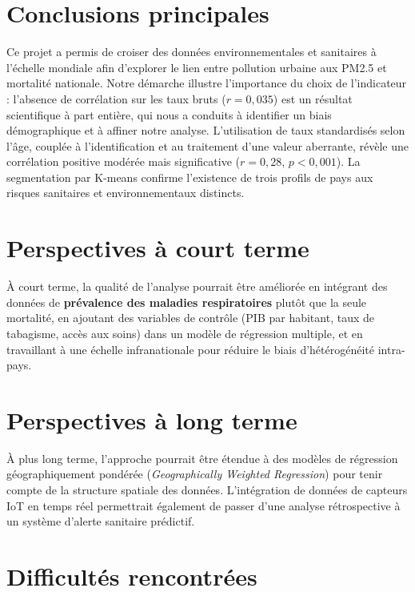 \documentclass[mstat,12pt]{unswthesis}
\begin{document}
\section{Conclusions principales}\label{conclusions-principales}

Ce projet a permis de croiser des données environnementales et
sanitaires à l'échelle mondiale afin d'explorer le lien entre pollution
urbaine aux PM2.5 et mortalité nationale. Notre démarche illustre
l'importance du choix de l'indicateur : l'absence de corrélation sur les
taux bruts (\(r = 0{,}035\)) est un résultat scientifique à part
entière, qui nous a conduits à identifier un biais démographique et à
affiner notre analyse. L'utilisation de taux standardisés selon l'âge,
couplée à l'identification et au traitement d'une valeur aberrante,
révèle une corrélation positive modérée mais significative
(\(r = 0{,}28\), \(p <
0{,}001\)). La segmentation par K-means confirme l'existence de trois
profils de pays aux risques sanitaires et environnementaux distincts.

\section{Perspectives à court
terme}\label{perspectives-uxe0-court-terme}

À court terme, la qualité de l'analyse pourrait être améliorée en
intégrant des données de \textbf{prévalence des maladies respiratoires}
plutôt que la seule mortalité, en ajoutant des variables de contrôle
(PIB par habitant, taux de tabagisme, accès aux soins) dans un modèle de
régression multiple, et en travaillant à une échelle infranationale pour
réduire le biais d'hétérogénéité intra-pays.

\section{Perspectives à long terme}\label{perspectives-uxe0-long-terme}

À plus long terme, l'approche pourrait être étendue à des modèles de
régression géographiquement pondérée
(\textit{Geographically Weighted Regression}) pour tenir compte de la
structure spatiale des données. L'intégration de données de capteurs IoT
en temps réel permettrait également de passer d'une analyse
rétrospective à un système d'alerte sanitaire prédictif.

\section{Difficultés rencontrées}\label{difficultuxe9s-rencontruxe9es}
\end{document}
